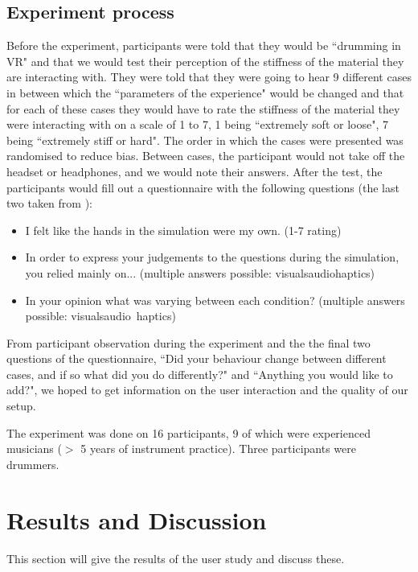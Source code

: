 \documentclass{article}
\begin{document}
\subsection{Experiment process}
Before the experiment, participants were told that they would be ``drumming in VR" and that we would test their perception of the stiffness of the material they are interacting with. They were told that they were going to hear 9 different cases in between which the ``parameters of the experience" would be changed and that for each of these cases they would have to rate the stiffness of the material they were interacting with on a scale of 1 to 7, 1 being ``extremely soft or loose", 7 being ``extremely stiff or hard". The order in which the cases were presented was randomised to reduce bias. Between cases, the participant would not take off the headset or headphones, and we would note their answers. After the test, the participants would fill out a questionnaire with the following questions (the last two taken from \cite{avanzini2006}):

\begin{itemize}
    \item I felt like the hands in the simulation were my own. (1-7 rating)
    \item In order to express your judgements to the questions during the simulation, you relied mainly on... (multiple answers possible: visuals\textbar audio\textbar haptics)
    \item In your opinion what was varying between each condition? (multiple answers possible: visuals\textbar audio\textbar\ haptics)
\end{itemize}
From participant observation during the experiment and the the final two questions of the questionnaire, ``Did your behaviour change between different cases, and if so what did you do differently?" and ``Anything you would like to add?", we hoped to get information on the user interaction and the quality of our setup.

The experiment was done on 16 participants, 9 of which were experienced musicians ($>$ 5 years of instrument practice). Three participants were drummers. 

\section{Results and Discussion}\label{sec:resDisc}
This section will give the results of the user study and discuss these.
\end{document}
